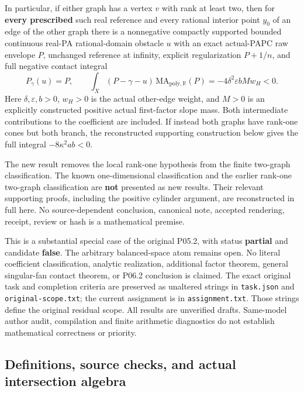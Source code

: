 \documentclass[
  11pt,
]{article}
\begin{document}
In particular, if either graph has a vertex \(v\) with rank at least
two, then for \textbf{every prescribed} such real reference and every
rational interior point \(y_0\) of an edge of the other graph there is a
nonnegative compactly supported bounded continuous real-PA
rational-domain obstacle \(u\) with an exact actual-PAPC raw envelope
\(P\), unchanged reference at infinity, explicit regularization
\(P+1/n\), and full negative contact integral \[
 P_\gamma(u)=P,\qquad
 \int_X(P-\gamma-u)\,\mathrm{MA}_{\mathrm{poly},\mathbb R}(P)
       =-4\delta^2\varepsilon b M w_H<0.                       \tag{HR0}
\] Here \(\delta,\varepsilon,b>0\), \(w_H>0\) is the actual other-edge
weight, and \(M>0\) is an explicitly constructed positive actual
first-factor slope mass. Both intermediate contributions to the
coefficient are included. If instead both graphs have rank-one cones but
both branch, the reconstructed supporting construction below gives the
full integral \(-8\kappa^2ab<0\).

The new result removes the local rank-one hypothesis from the finite
two-graph classification. The known one-dimensional classification and
the earlier rank-one two-graph classification are \textbf{not} presented
as new results. Their relevant supporting proofs, including the positive
cylinder argument, are reconstructed in full here. No source-dependent
conclusion, canonical note, accepted rendering, receipt, review or hash
is a mathematical premise.

This is a substantial special case of the original P05.2, with status
\textbf{partial} and candidate \textbf{false}. The arbitrary
balanced-space atom remains open. No literal coefficient classification,
analytic realization, additional factor theorem, general singular-fan
contact theorem, or P06.2 conclusion is claimed. The exact original task
and completion criteria are preserved as unaltered strings in
\texttt{task.json} and \texttt{original-scope.txt}; the current
assignment is in \texttt{assignment.txt}. Those strings define the
original residual scope. All results are unverified drafts. Same-model
author audit, compilation and finite arithmetic diagnostics do not
establish mathematical correctness or priority.

\subsection{Definitions, source checks, and actual intersection
algebra}\label{definitions-source-checks-and-actual-intersection-algebra}
\end{document}
